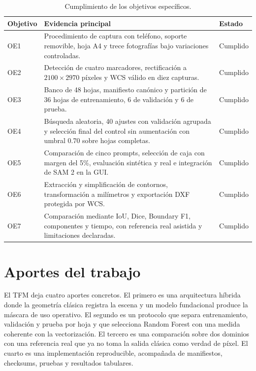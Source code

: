 \begin{table}[htbp]
\centering
\small
\caption{Cumplimiento de los objetivos específicos.}
\label{tab:cumplimiento_objetivos}
\begin{tabularx}{\textwidth}{p{1.6cm}Yp{1.8cm}}
\toprule
\textbf{Objetivo} & \textbf{Evidencia principal} & \textbf{Estado} \\
\midrule
OE1 & Procedimiento de captura con teléfono, soporte removible, hoja A4 y trece fotografías bajo variaciones controladas. & Cumplido \\
OE2 & Detección de cuatro marcadores, rectificación a $2100\times2970$ píxeles y WCS válido en diez capturas. & Cumplido \\
OE3 & Banco de 48 hojas, manifiesto canónico y partición de 36 hojas de entrenamiento, 6 de validación y 6 de prueba. & Cumplido \\
OE4 & Búsqueda aleatoria, 40 ajustes con validación agrupada y selección final del control sin aumentación con umbral 0.70 sobre hojas completas. & Cumplido \\
OE5 & Comparación de cinco prompts, selección de caja con margen del 5\%, evaluación sintética y real e integración de SAM 2 en la GUI. & Cumplido \\
OE6 & Extracción y simplificación de contornos, transformación a milímetros y exportación DXF protegida por WCS. & Cumplido \\
OE7 & Comparación mediante IoU, Dice, Boundary F1, componentes y tiempo, con referencia real asistida y limitaciones declaradas. & Cumplido \\
\bottomrule
\end{tabularx}
\end{table}

\section{Aportes del trabajo}

El TFM deja cuatro aportes concretos. El primero es una arquitectura híbrida donde la geometría clásica registra la escena y un modelo fundacional produce la máscara de uso operativo. El segundo es un protocolo que separa entrenamiento, validación y prueba por hoja y que selecciona Random Forest con una medida coherente con la vectorización. El tercero es una comparación sobre dos dominios con una referencia real que ya no toma la salida clásica como verdad de píxel. El cuarto es una implementación reproducible, acompañada de manifiestos, checksums, pruebas y resultados tabulares.

